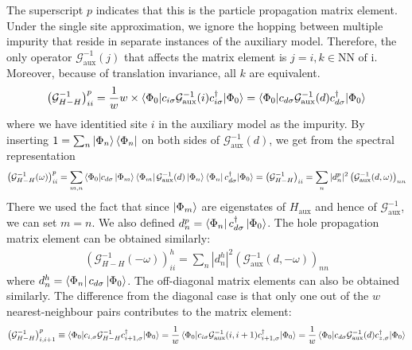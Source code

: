 \documentclass{report}
\numberwithin{equation}{section}
\begin{document}
The superscript \(p\) indicates that this is the particle propagation matrix element.
Under the single site approximation, we ignore the hopping between multiple impurity that reside in separate instances of the auxiliary model. Therefore, the only operator \(\mathcal{G}^{-1}_\text{aux}(j)\) that affects the matrix element is \(j=i, k \in \text{NN of i}\). Moreover, because of translation invariance, all \(k\) are equivalent.
\begin{equation}\begin{aligned}
	\left(\mathcal{G}^{-1}_{H-H}\right)^p_{ii} = \frac{1}{w} w\times \braket{\Phi_0 | c_{i\sigma} \mathcal{G}^{-1}_\text{aux}(i) c^\dagger_{i\sigma} | \Phi_0} = \braket{\Phi_0 | c_{d\sigma} \mathcal{G}^{-1}_\text{aux}(d) c^\dagger_{d\sigma} | \Phi_0}
\end{aligned}\end{equation}
where we have identitied site \(i\) in the auxiliary model as the impurity.
By inserting \(1 = \sum_n \ket{\Phi_n}\bra{\Phi_n}\) on both sides of \(\mathcal{G}^{-1}_\text{aux}(d)\), we get from the spectral representation
\begin{equation}\begin{aligned}
	\left(\mathcal{G}^{-1}_{H-H}(\omega)\right)^p_{ii} = \sum_{m,n} \braket{\Phi_0 | c_{d\sigma} \ket{\Phi_m}\bra{\Phi_m}\mathcal{G}^{-1}_\text{aux}(d) \ket{\Phi_n}\bra{\Phi_n} c^\dagger_{d\sigma} | \Phi_0} = \left(\mathcal{G}^{-1}_{H-H}\right)_{ii} = \sum_{n} |d^p_n|^2 \left(\mathcal{G}^{-1}_\text{aux}(d, \omega)\right)_{nn} 
\end{aligned}\end{equation}
There we used the fact that since \(\ket{\Phi_m}\) are eigenstates of \(H_\text{aux}\) and hence of \(\mathcal{G}^{-1}_\text{aux}\), we can set \(m=n\). We also defined \(d^p_n = \bra{\Phi_n}c^\dagger_{d\sigma}\ket{\Phi_0}\). The hole propagation matrix element can be obtained similarly:
\begin{equation}\begin{aligned}
	\left(\mathcal{G}^{-1}_{H-H}(-\omega)\right)^h_{ii} = \sum_{n} |d^h_n|^2 \left(\mathcal{G}^{-1}_\text{aux}(d, -\omega)\right)_{nn} 
\end{aligned}\end{equation}
where \(d^h_n = \bra{\Phi_n}c_{d\sigma}\ket{\Phi_0}\). The off-diagonal matrix elements can also be obtained similarly. The difference from the diagonal case is that only one out of the \(w\) nearest-neighbour pairs contributes to the matrix element:
\begin{equation}\begin{aligned}
	\left(\mathcal{G}^{-1}_{H-H}\right)^p_{i,i+1} \equiv \braket{\Phi_0 | c_{i,\sigma} \mathcal{G}^{-1}_{H-H} c^\dagger_{i+1,\sigma} | \Phi_0} = \frac{1}{w}\braket{\Phi_0 | c_{i\sigma} \mathcal{G}^{-1}_\text{aux}(i,i+1) c^\dagger_{i+1,\sigma} | \Phi_0} = \frac{1}{w}\braket{\Phi_0 | c_{d\sigma} \mathcal{G}^{-1}_\text{aux}(d) c^\dagger_{z,\sigma} | \Phi_0}
\end{aligned}\end{equation}
\end{document}

